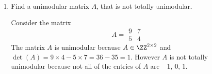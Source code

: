 \documentclass[11pt, oneside]{article}
\begin{document}
\begin{enumerate}
\begin{proof}
      Now assume $\br{A\ I}$ is unimodular.
      Consider any square submatrix of $A$ determined by rows $M = \set{i_k}$
      and columns $N = \set{j_k}$.
      Consider a subset of the columns of $I$ determined by $M^c$, that is
      let $I_b = \br{e_i: i \in M^c}$.
      Also let $A_b = \br{a_j: j in N}$, be the columns of $A$ determined by
      $N$.
      Then the square matric $\br{A_b\ I_b}$ is either a basis of $\br{A\ I}$
      in which case the determinant is $\pm 1$ or $\br{A_b\ I_b}$ is not a basis
      of $\br{A\ I}$ in which case the determinant is $0$.
      It was shown in the last argument that the
      \[
        \det\p{\br{A_b\ I_n}} = \pm 1\det\p{A[M, N]}
      \]
      where $A[M, N]$ is the square submatrix.
      Equivalently 
      \[
        \det\p{A[M, N]} = \pm 1 \det\p{\br{A_b\ I_n}}
      \]
      Given the three possibilities of the deteminant of $\br{A_b\ I_b}$, it can
      be seen that $\det\p{A[M, N]} = 0, \pm 1$.
      Thus $A$ is totally unimodular as any square submatrix has determinant
      $0$ or $\pm 1$.
    \end{proof}

  \item %
    Find a unimodular matrix $A$, that is not totally unimodular.

    Consider the matrix
    \[
      A =
      \begin{matrix}
        9 & 7 \\
        5 & 4
      \end{matrix}
    \]
    The matrix $A$ is unimodular because
    $A \in \ZZ^{2 \times 2}$ and
    $\det(A) = 9 \times 4 - 5 \times 7 = 36 - 35 = 1$.
    However $A$ is not totally unimodular because not all of the
    entries of $A$ are $-1$, $0$, $1$.
\end{enumerate}
\end{document}
